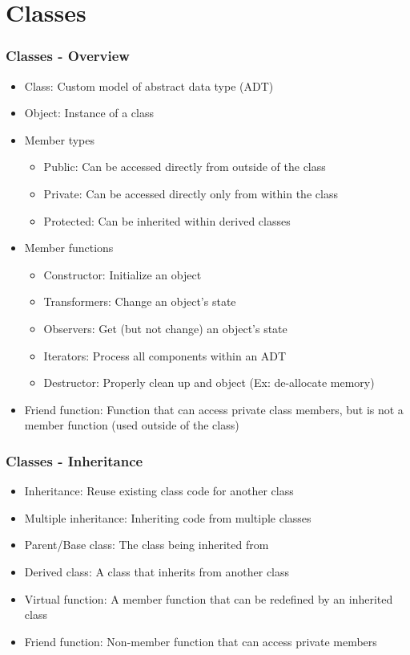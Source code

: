 \section{Classes}
\begin{frame}\frametitle{Classes - Overview}
\begin{itemize}
\item Class: Custom model of abstract data type (ADT)
\item Object: Instance of a class
\item Member types
	\begin{itemize}
	\item Public: Can be accessed directly from outside of the class
	\item Private: Can be accessed directly only from within the class
	\item Protected: Can be inherited within derived classes
	\end{itemize}
\item Member functions
	\begin{itemize}
	\item Constructor: Initialize an object
	\item Transformers: Change an object's state
	\item Observers: Get (but not change) an object's state
	\item Iterators: Process all components within an ADT
	\item Destructor: Properly clean up and object (Ex: de-allocate memory)
	\end{itemize}
\item Friend function: Function that can access private class members, but is not a member function (used outside of the class)
\end{itemize}
\end{frame}

\begin{frame}\frametitle{Classes - Inheritance}
\begin{itemize}
\item Inheritance: Reuse existing class code for another class
\item Multiple inheritance: Inheriting code from multiple classes
\item Parent/Base class: The class being inherited from
\item Derived class: A class that inherits from another class
\item Virtual function: A member function that can be redefined by an inherited class
\item Friend function: Non-member function that can access private members
\end{itemize}
\end{frame}

